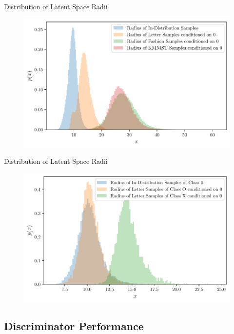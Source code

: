 \documentclass[aspectratio=169]{beamer}
\begin{document}
\begin{frame}{Distribution of Latent Space Radii}
\begin{figure}[htpb]
	\includegraphics[height=0.7\textheight]{figures/samples/emnist_radius_hist.pdf}
\end{figure}
\end{frame}

\begin{frame}{Distribution of Latent Space Radii}
\begin{figure}[htpb]
	\includegraphics[height=0.7\textheight]{figures/samples/emnist_radius_hist_xo.pdf}
\end{figure}
\end{frame}

\subsection{Discriminator Performance}
\end{document}
